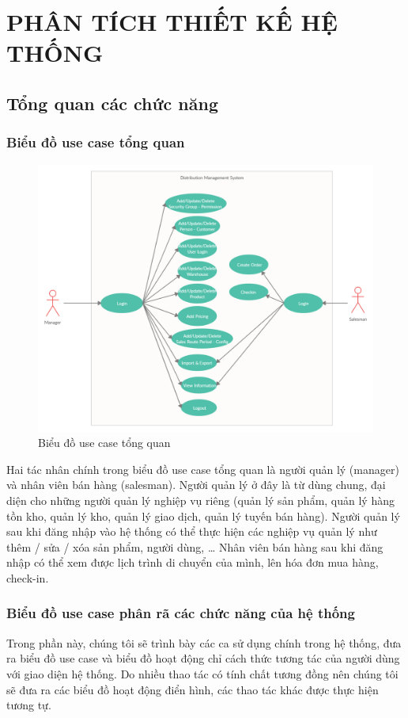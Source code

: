 \chapter{PHÂN TÍCH THIẾT KẾ HỆ THỐNG}
\section{Tổng quan các chức năng}
\subsection{Biểu đồ use case tổng quan}
\begin{figure}[H]
    \centering
    \includegraphics[width=12cm]{images/use-case/use-case-summary.jpg}
    \caption{Biểu đồ use case tổng quan}
\end{figure}

Hai tác nhân chính trong biểu đồ use case tổng quan
là người quản lý (manager) và nhân viên bán hàng (salesman).
Người quản lý ở đây là từ dùng chung, đại diện cho những người
quản lý nghiệp vụ riêng (quản lý sản phẩm, quản lý hàng tồn kho,
quản lý kho, quản lý giao dịch, quản lý tuyến bán hàng).
Người quản lý sau khi đăng nhập vào hệ thống có thể thực hiện
các nghiệp vụ quản lý như thêm / sửa / xóa sản phẩm, người dùng, …
Nhân viên bán hàng sau khi đăng nhập có thể xem được lịch
trình di chuyển của mình, lên hóa đơn mua hàng, check-in.

\subsection{Biểu đồ use case phân rã các chức năng của hệ thống}
Trong phần này, chúng tôi sẽ trình bày các ca sử dụng chính trong hệ
thống, đưa ra biểu đồ use case và biểu đồ hoạt động chỉ cách
thức tương tác của người dùng với giao diện hệ thống. Do nhiều thao
tác có tính chất tương đồng nên chúng tôi sẽ đưa ra các biểu
đồ hoạt động điển hình, các thao tác khác được thực hiện tương tự.

